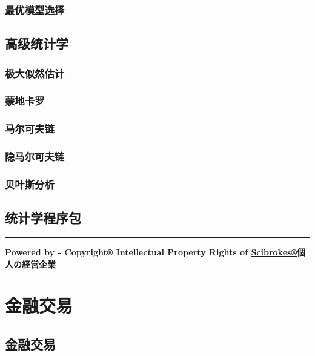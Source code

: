 \documentclass[]{book}
\theoremstyle{definition}
\theoremstyle{definition}
\theoremstyle{definition}
\theoremstyle{remark}
\begin{document}
\subsection{最优模型选择}

\section{高级统计学}

\subsection{极大似然估计}

\subsection{蒙地卡罗}

\subsection{马尔可夫链}

\subsection{隐马尔可夫链}

\subsection{贝叶斯分析}

\section{统计学程序包}

\begin{center}\rule{0.5\linewidth}{\linethickness}\end{center}

\textbf{Powered by - Copyright® Intellectual Property Rights of
\href{http://www.scibrokes.com}{Scibrokes®}個人の経営企業}

\hypertarget{finance}{%
\chapter{金融交易}\label{finance}}

\section{金融交易}
\end{document}

